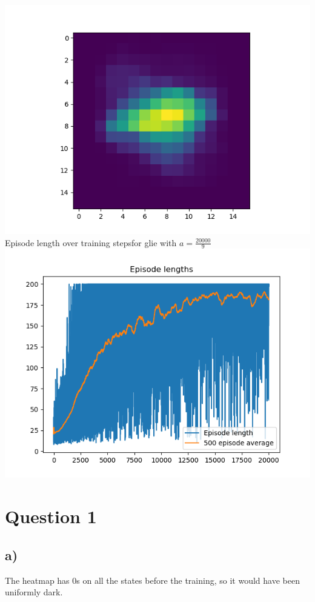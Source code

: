 \documentclass{article}
\begin{document}
\includegraphics[scale=0.45]{glieepsnormtraining.png}\\

Episode length over training stepsfor glie with $a = \frac{20000}{9}$ \\


\includegraphics[scale=0.45]{glieepsnormaltraining.png}\\



\section{Question 1}
\subsection{a)}
The heatmap has 0s on all the states before the training, so it would have been uniformly dark.
\end{document}

